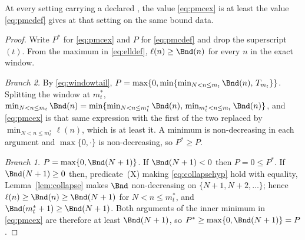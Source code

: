 
\begin{proposition}\label{prop:exactnoworse}
At every setting carrying a declared , the value
\eqref{eq:pmcex} is at least the value \eqref{eq:pmcdef} gives at that
setting on the same bound data.
\end{proposition}

\begin{proof}
Write $P^{\ast}$ for \eqref{eq:pmcex} and $P$ for \eqref{eq:pmcdef} and drop
the superscript $(t)$. From the maximum in \eqref{eq:elldef},
$\ell(n)\ge\Bnd(n)$ for every $n$ in the exact window.

\emph{Branch 2.} By \eqref{eq:windowtail},
$P=\max\{0,\min\{\min_{N<n\le m_t}\Bnd(n),\,T_{m_t}\}\}$. Splitting the window
at $m^{\ast}_t$,
$\min_{N<n\le m_t}\Bnd(n)=\min\{\min_{N<n\le m^{\ast}_t}\Bnd(n),\,
\min_{m^{\ast}_t<n\le m_t}\Bnd(n)\}$, and \eqref{eq:pmcex} is that same
expression with the first of the two replaced by
$\min_{N<n\le m^{\ast}_t}\ell(n)$, which is at least it. A minimum is
non-decreasing in each argument and $\max\{0,\cdot\}$ is non-decreasing, so
$P^{\ast}\ge P$.

\emph{Branch 1.} $P=\max\{0,\Bnd(N+1)\}$. If $\Bnd(N+1)<0$ then $P=0\le
P^{\ast}$. If $\Bnd(N+1)\ge0$ then, predicate~(X) making \eqref{eq:collapsehyp}
hold with equality, Lemma~\ref{lem:collapse} makes $\Bnd$ non-decreasing on
$\{N+1,N+2,\dots\}$; hence $\ell(n)\ge\Bnd(n)\ge\Bnd(N+1)$ for
$N<n\le m^{\ast}_t$, and $\Bnd(m^{\ast}_t+1)\ge\Bnd(N+1)$. Both arguments of
the inner minimum in \eqref{eq:pmcex} are therefore at least $\Bnd(N+1)$, so
$P^{\ast}\ge\max\{0,\Bnd(N+1)\}=P$.
\end{proof}
